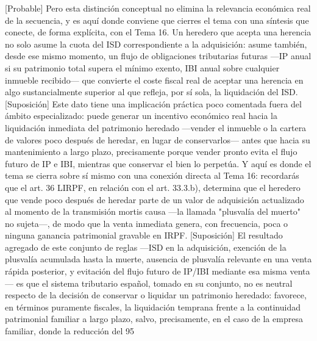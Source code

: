 \documentclass[10pt,a4paper]{article}
\begin{document}
[Probable] Pero esta distinción conceptual no elimina la relevancia económica real de la secuencia, y es aquí donde conviene que cierres el tema con una síntesis que conecte, de forma explícita, con el Tema 16. Un heredero que acepta una herencia no solo asume la cuota del ISD correspondiente a la adquisición: asume también, desde ese mismo momento, un flujo de obligaciones tributarias futuras —IP anual si su patrimonio total supera el mínimo exento, IBI anual sobre cualquier inmueble recibido— que convierte el coste fiscal real de aceptar una herencia en algo sustancialmente superior al que refleja, por sí sola, la liquidación del ISD. [Suposición] Este dato tiene una implicación práctica poco comentada fuera del ámbito especializado: puede generar un incentivo económico real hacia la liquidación inmediata del patrimonio heredado —vender el inmueble o la cartera de valores poco después de heredar, en lugar de conservarlos— antes que hacia su mantenimiento a largo plazo, precisamente porque vender pronto evita el flujo futuro de IP e IBI, mientras que conservar el bien lo perpetúa. Y aquí es donde el tema se cierra sobre sí mismo con una conexión directa al Tema 16: recordarás que el art. 36 LIRPF, en relación con el art. 33.3.b), determina que el heredero que vende poco después de heredar parte de un valor de adquisición actualizado al momento de la transmisión mortis causa —la llamada "plusvalía del muerto" no sujeta—, de modo que la venta inmediata genera, con frecuencia, poca o ninguna ganancia patrimonial gravable en IRPF. [Suposición] El resultado agregado de este conjunto de reglas —ISD en la adquisición, exención de la plusvalía acumulada hasta la muerte, ausencia de plusvalía relevante en una venta rápida posterior, y evitación del flujo futuro de IP/IBI mediante esa misma venta— es que el sistema tributario español, tomado en su conjunto, no es neutral respecto de la decisión de conservar o liquidar un patrimonio heredado: favorece, en términos puramente fiscales, la liquidación temprana frente a la continuidad patrimonial familiar a largo plazo, salvo, precisamente, en el caso de la empresa familiar, donde la reducción del 95%
\end{document}
